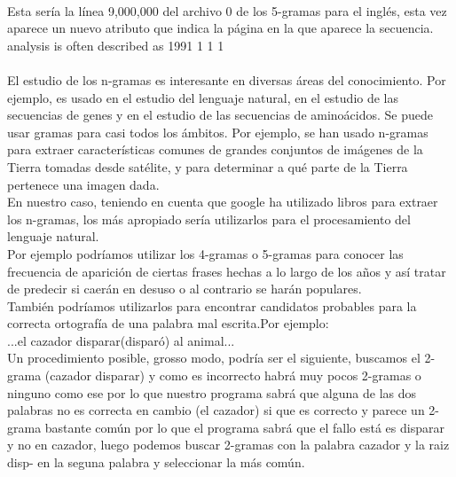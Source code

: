 \documentclass[es]{ifirak}
\begin{document}
\paragraph{}
Esta sería la línea 9,000,000 del archivo 0 de los 5-gramas para el inglés, esta vez aparece un nuevo atributo que indica la página en la que aparece la secuencia.\\
analysis is often described as \hspace{0.7cm} 1991 \hspace{0.7cm} 1 \hspace{0.7cm} 1 \hspace{0.7cm} 1

\paragraph{}
El estudio de los n-gramas es interesante en diversas áreas del conocimiento. Por ejemplo, es usado en el estudio del lenguaje natural, en el estudio de las secuencias de genes y en el estudio de las secuencias de aminoácidos. Se puede usar gramas para casi todos los ámbitos. Por ejemplo, se han usado n-gramas para extraer características comunes de grandes conjuntos de imágenes de la Tierra tomadas desde satélite, y para determinar a qué parte de la Tierra pertenece una imagen dada.\\

En nuestro caso, teniendo en cuenta que google ha utilizado libros para extraer los n-gramas, los más apropiado sería utilizarlos para el procesamiento del lenguaje natural.\\

Por ejemplo podríamos utilizar los 4-gramas o 5-gramas para conocer las frecuencia de aparición de ciertas frases hechas a lo largo de los años y así tratar de predecir si caerán en desuso o al contrario se harán populares.\\

También podríamos utilizarlos para encontrar candidatos probables para la correcta ortografía de una palabra mal escrita.Por ejemplo:\\

...el cazador disparar(disparó) al animal...\\

Un procedimiento posible, grosso modo, podría ser el siguiente, buscamos el 2-grama (cazador disparar) y como es incorrecto habrá muy pocos 2-gramas o ninguno como ese por lo que nuestro programa sabrá que alguna de las dos palabras no es correcta en cambio (el cazador) si que es correcto y parece un 2-grama bastante común por lo que el programa sabrá que el fallo está es disparar y no en cazador, luego podemos buscar 2-gramas con la palabra cazador y la raiz disp- en la seguna palabra y seleccionar la más común. \\
\end{document}
